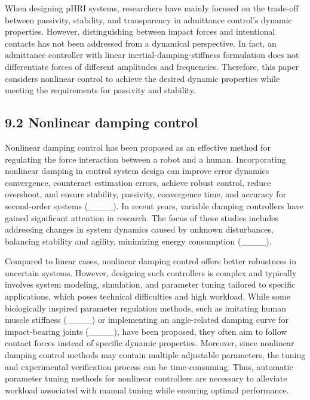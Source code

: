 When designing pHRI systems, researchers have mainly focused on the trade-off between passivity, stability, and transparency in admittance control's dynamic properties. However, distinguishing between impact forces and intentional contacts has not been addressed from a dynamical perspective. In fact, an admittance controller with linear inertial-damping-stiffness formulation does not differentiate forces of different amplitudes and frequencies. Therefore, this paper considers nonlinear control to achieve the desired dynamic properties while meeting the requirements for passivity and stability.

\subsection{9.2 Nonlinear damping control}
Nonlinear damping control has been proposed as an effective method for regulating the force interaction between a robot and a human. 
Incorporating nonlinear damping in control system design can improve error dynamics convergence, counteract estimation errors, achieve robust control, reduce overshoot, and ensure stability, passivity, convergence time, and accuracy for second-order systems (____). In recent years, variable damping controllers have gained significant attention in research. The focus of these studies includes addressing changes in system dynamics caused by unknown disturbances, balancing stability and agility, minimizing energy consumption (____).

Compared to linear cases, nonlinear damping control offers better robustness in uncertain systems. However, designing such controllers is complex and typically involves system modeling, simulation, and parameter tuning tailored to specific applications, which poses technical difficulties and high workload. While some biologically inspired parameter regulation methods, such as imitating human muscle stiffness (____) or implementing an angle-related damping curve for impact-bearing joints (____), have been proposed, they often aim to follow contact forces instead of specific dynamic properties. Moreover, since nonlinear damping control methods may contain multiple adjustable parameters, the tuning and experimental verification process can be time-consuming. Thus, automatic parameter tuning methods for nonlinear controllers are necessary to alleviate workload associated with manual tuning while ensuring optimal performance.


